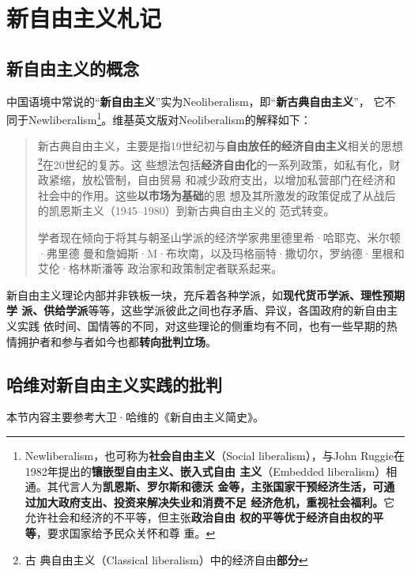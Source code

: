 \chapter{新自由主义札记}
\label{chap:neoliber}

\section{新自由主义的概念}
\label{sec:neoliberalism}


中国语境中常说的“\textbf{新自由主义}”实为Neoliberalism，即“\textbf{新古典自由主义}”，
它不同于Newliberalism\footnote{Newliberalism，也可称为\textbf{社会自由主义}（Social
  liberalism），与John Ruggie在1982年提出的\textbf{镶嵌型自由主义、嵌入式自由
    主义}（Embedded liberalism）相通。其代言人为\textbf{凯恩斯、罗尔斯和德沃
    金等，主张国家干预经济生活，可通过加大政府支出、投资来解决失业和消费不足
    经济危机，重视社会福利。}它允许社会和经济的不平等，但主张\textbf{政治自由
    权的平等优于经济自由权的平等}，要求国家给予民众关怀和尊
  重。\cite{newneo}}。维基英文版对Neoliberalism的解释如下：

\begin{quotation}
  新古典自由主义，主要是指19世纪初与\textbf{自由放任的经济自由主义}相关的思想\footnote{古
    典自由主义（Classical liberalism）中的经济自由\textbf{部分}}在20世纪的复苏。这
  些想法包括\textbf{经济自由化}的一系列政策，如私有化，财政紧缩，放松管制，自由贸易
  和减少政府支出，以增加私营部门在经济和社会中的作用。这些\textbf{以市场为基础}的思
  想及其所激发的政策促成了从战后的凯恩斯主义（1945--1980）到新古典自由主义的
  范式转变。

  学者现在倾向于将其与朝圣山学派的经济学家弗里德里希·哈耶克、米尔顿·弗里德
  曼和詹姆斯·M·布坎南，以及玛格丽特·撒切尔，罗纳德·里根和艾伦·格林斯潘等
  政治家和政策制定者联系起来。
\end{quotation}

新自由主义理论内部并非铁板一块，充斥着各种学派，如\textbf{现代货币学派、理性预期学
  派、供给学派}等等，这些学派彼此之间也存矛盾、异议，各国政府的新自由主义实践
依时间、国情等的不同，对这些理论的侧重均有不同\cite{neoxuepai}，也有一些早期的热
情拥护者和参与者如今也都\textbf{转向批判立场}。


\section{哈维对新自由主义实践的批判}

本节内容主要参考大卫·哈维的《新自由主义简史》。

